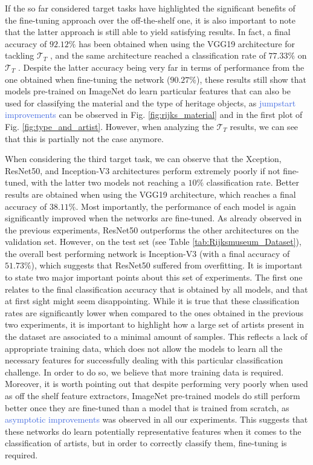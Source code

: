 If the so far considered target tasks have highlighted the significant benefits of the fine-tuning approach over the off-the-shelf one, it is also important to note that the latter approach is still able to yield satisfying results. In fact, a final accuracy of $92.12\%$ has been obtained when using the VGG19 architecture for tackling $\mathcal{T}_T$ , and the same architecture reached a classification rate of $77.33\%$ on $\mathcal{T}_T$ . Despite the latter accuracy being very far in terms of performance from the one obtained when fine-tuning the network ($90.27\%$), these results still show that models pre-trained on ImageNet do learn particular features that can also be used for classifying the material and the type of heritage objects, as \textcolor{RoyalBlue}{jumpstart improvements} can be observed in Fig. \ref{fig:rijks_material} and in the first plot of Fig. \ref{fig:type_and_artist}.  However, when analyzing the $\mathcal{T}_T$  results, we can see that this is partially not the case anymore.




When considering the third target task, we can observe that the Xception, ResNet50, and Inception-V3 architectures perform extremely poorly if not fine-tuned, with the latter two models not reaching a $10\%$ classification rate. Better results are obtained when using the VGG19 architecture, which reaches a final accuracy of $38.11\%$. Most importantly, the performance of each model is again significantly improved when the networks are fine-tuned. As already observed in the previous experiments, ResNet50 outperforms the other architectures on the validation set. However, on the test set (see Table \ref{tab:Rijksmuseum_Dataset}), the overall best performing network is Inception-V3 (with a final accuracy of $51.73\%$), which suggests that ResNet50 suffered from overfitting. It is important to state two major important points about this set of experiments. The first one relates to the final classification accuracy that is obtained by all models, and that at first sight might seem disappointing. While it is true that these classification rates are significantly lower when compared to the ones obtained in the previous two experiments, it is important to highlight how a large set of artists present in the dataset are associated to a minimal amount of samples. This reflects a lack of appropriate training data, which does not allow the models to learn all the necessary features for successfully dealing with this particular classification challenge. In order to do so, we believe that more training data is required. Moreover, it is worth pointing out that despite performing very poorly when used as off the shelf feature extractors, ImageNet pre-trained models do still perform better once they are fine-tuned than a model that is trained from scratch, as \textcolor{RoyalBlue}{asymptotic improvements} was observed in all our experiments. This suggests that these networks do learn potentially representative features when it comes to the classification of artists, but in order to correctly classify them, fine-tuning is required.

